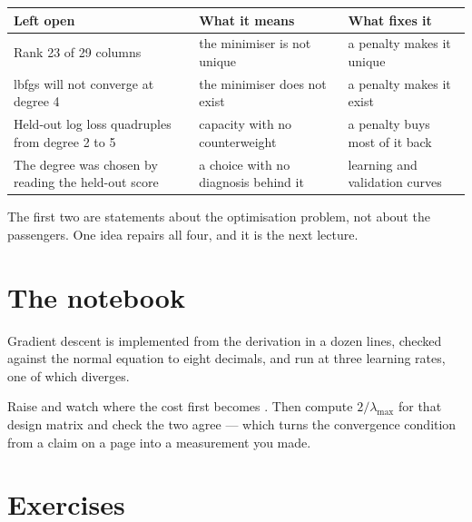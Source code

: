 \documentclass[11pt,a4paper]{article}
\begin{document}
\begin{center}
\small
\begin{tabular}{p{}p{}p{}}
\toprule
\textbf{Left open} & \textbf{What it means} & \textbf{What fixes it} \\
\midrule
Rank 23 of 29 columns & the minimiser is not unique & a penalty makes it
                                                      unique \\
lbfgs will not converge at degree 4 & the minimiser does not exist & a penalty
                                                      makes it exist \\
Held-out log loss quadruples from degree 2 to 5 & capacity with no counterweight
                                                & a penalty buys most of it
                                                  back \\
The degree was chosen by reading the held-out score & a choice with no
                                                diagnosis behind it &
                                                learning and validation
                                                curves \\
\bottomrule
\end{tabular}
\end{center}

The first two are statements about the optimisation problem, not about the
passengers. One idea repairs all four, and it is the next lecture.

\section{The notebook}

\begin{trybox}[title={What to change}]
Gradient descent is implemented from the derivation in a dozen lines, checked
against the normal equation to eight decimals, and run at three learning rates,
one of which diverges.

Raise  and watch where the cost first becomes .
Then compute $2/\lambda_{\max}$ for that design matrix and check the two agree
--- which turns the convergence condition from a claim on a page into a
measurement you made.
\end{trybox}

\section{Exercises}
\end{document}
